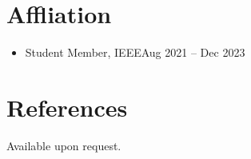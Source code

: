 \documentclass[10pt,margin,line,pifont,palatino,courier]{res}
\begin{document}
\begin{resume}
\section{\sc Affliation}

\begin{itemize}[leftmargin=*]
    \item Student Member, IEEE\hfill Aug 2021 -- Dec 2023
\end{itemize}

\section{\sc References}
{\sc Available upon request.}

%


\end{resume}
\end{document}
